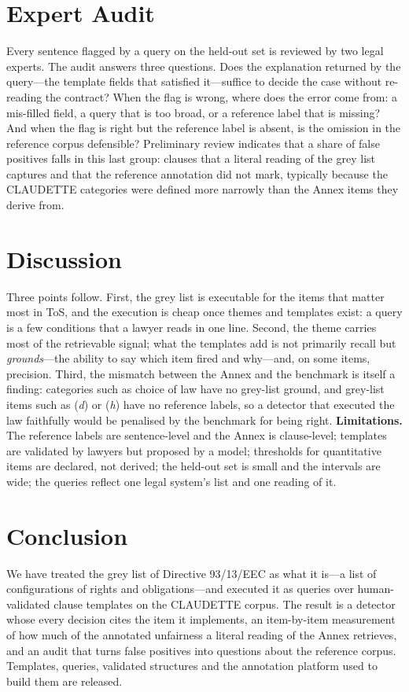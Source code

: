 \documentclass{IOS-Book-Article}
\newcommand{\corpus}{CLAUDETTE}
\newcommand{\gi}[1]{(\textit{#1})}
\begin{document}
\section{Expert Audit}
\label{sec:audit}
Every sentence flagged by a query on the held-out set is reviewed by two legal experts. The audit answers three questions. Does the explanation returned by the query---the template fields that satisfied it---suffice to decide the case without re-reading the contract? When the flag is wrong, where does the error come from: a mis-filled field, a query that is too broad, or a reference label that is missing? And when the flag is right but the reference label is absent, is the omission in the reference corpus defensible? Preliminary review indicates that a share of false positives falls in this last group: clauses that a literal reading of the grey list captures and that the reference annotation did not mark, typically because the \corpus{} categories were defined more narrowly than the Annex items they derive from.

\section{Discussion}
\label{sec:discussion}
Three points follow. First, the grey list is executable for the items that matter most in ToS, and the execution is cheap once themes and templates exist: a query is a few conditions that a lawyer reads in one line. Second, the theme carries most of the retrievable signal; what the templates add is not primarily recall but \emph{grounds}---the ability to say which item fired and why---and, on some items, precision. Third, the mismatch between the Annex and the benchmark is itself a finding: categories such as choice of law have no grey-list ground, and grey-list items such as \gi{d} or \gi{h} have no reference labels, so a detector that executed the law faithfully would be penalised by the benchmark for being right. \textbf{Limitations.} The reference labels are sentence-level and the Annex is clause-level; templates are validated by lawyers but proposed by a model; thresholds for quantitative items are declared, not derived; the held-out set is small and the intervals are wide; the queries reflect one legal system's list and one reading of it.

\section{Conclusion}
\label{sec:conclusion}
We have treated the grey list of Directive 93/13/EEC as what it is---a list of configurations of rights and obligations---and executed it as queries over human-validated clause templates on the \corpus{} corpus. The result is a detector whose every decision cites the item it implements, an item-by-item measurement of how much of the annotated unfairness a literal reading of the Annex retrieves, and an audit that turns false positives into questions about the reference corpus. Templates, queries, validated structures and the annotation platform used to build them are released.



\end{document}
